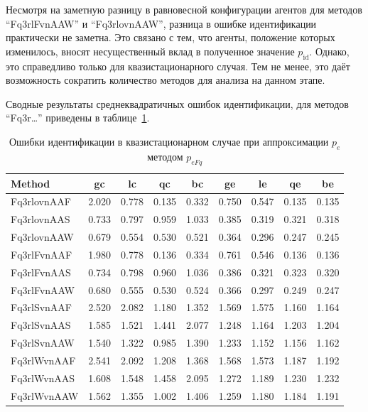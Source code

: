 Несмотря на заметную разницу в равновесной конфигурации агентов
для методов ``Fq3rlFvnAAW'' и ``Fq3rlovnAAW'',
разница в ошибке идентификации практически не заметна.
Это связано с тем, что агенты, положение которых изменилось,
вносят несущественный вклад в полученное значение $p_\mathrm{id}$.
Однако, это справедливо только для квазистационарного случая.
Тем не менее, это даёт возможность сократить количество методов для
анализа на данном этапе.

Сводные результаты среднеквадратичных ошибок идентификации, для методов ``Fq3r\ldots''
приведены в таблице~\ref{atu:t:err_test_id_Fq}.

\begin{table}[htb!]
  \caption{Ошибки идентификации в квазистационарном случае при аппроксимации $p_e$ методом $p_{eFq}$}
  \label{atu:t:err_test_id_Fq}
  \begin{center}
    \begin{tabular}{|l|c|c|c|c|c|c|c|c|}
    \hline
    Method      & gc    & lc    & qc    & bc    & ge     & le    & qe    & be    \\ \hline
    Fq3rlovnAAF & 2.020 & 0.778 & 0.135 & 0.332 & 0.750  & 0.547 & 0.135 & 0.135 \\ \hline
    Fq3rlovnAAS & 0.733 & 0.797 & 0.959 & 1.033 & 0.385  & 0.319 & 0.321 & 0.318 \\ \hline
    Fq3rlovnAAW & 0.679 & 0.554 & 0.530 & 0.521 & 0.364  & 0.296 & 0.247 & 0.245 \\ \hline
    Fq3rlFvnAAF & 1.980 & 0.778 & 0.136 & 0.334 & 0.761  & 0.546 & 0.136 & 0.136 \\ \hline
    Fq3rlFvnAAS & 0.734 & 0.798 & 0.960 & 1.036 & 0.386  & 0.321 & 0.323 & 0.320 \\ \hline
    Fq3rlFvnAAW & 0.680 & 0.555 & 0.530 & 0.524 & 0.366  & 0.297 & 0.249 & 0.247 \\ \hline
    Fq3rlSvnAAF & 2.520 & 2.082 & 1.180 & 1.352 & 1.569  & 1.575 & 1.160 & 1.164 \\ \hline
    Fq3rlSvnAAS & 1.585 & 1.521 & 1.441 & 2.077 & 1.248  & 1.164 & 1.203 & 1.204 \\ \hline
    Fq3rlSvnAAW & 1.540 & 1.322 & 0.985 & 1.390 & 1.233  & 1.152 & 1.156 & 1.162 \\ \hline
    Fq3rlWvnAAF & 2.541 & 2.092 & 1.208 & 1.368 & 1.568  & 1.573 & 1.187 & 1.192 \\ \hline
    Fq3rlWvnAAS & 1.608 & 1.548 & 1.458 & 2.095 & 1.272  & 1.189 & 1.230 & 1.232 \\ \hline
    Fq3rlWvnAAW & 1.562 & 1.355 & 1.002 & 1.406 & 1.259  & 1.180 & 1.184 & 1.191 \\ \hline
    \end{tabular}
  \end{center}
\end{table}

